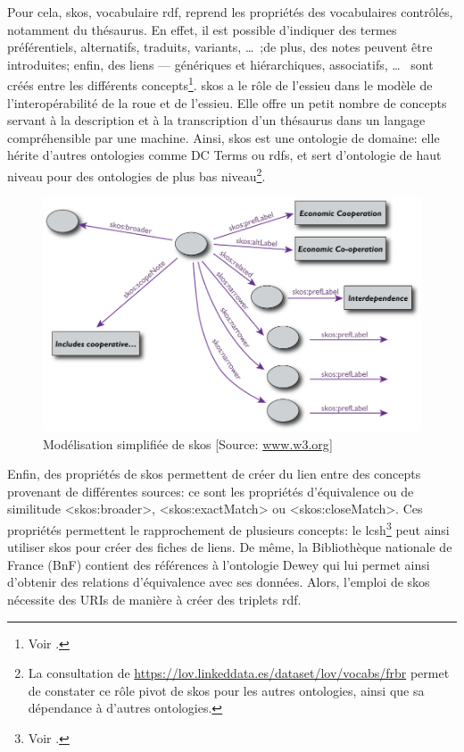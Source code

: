 Pour cela, \ac{skos}, vocabulaire \ac{rdf}, reprend les propriétés des vocabulaires contrôlés, notamment du thésaurus. En effet, il est possible d'indiquer des termes préférentiels, alternatifs, traduits, variants, \dots~;de plus, des notes peuvent être introduites; enfin, des liens --- génériques et hiérarchiques, associatifs, \dots~ sont créés entre les différents concepts\footnote{Voir .}. \ac{skos} a le rôle de l'essieu dans le modèle de l'interopérabilité de la roue et de l'essieu. Elle offre un petit nombre de concepts servant à la description et à la transcription d'un thésaurus dans un langage compréhensible par une machine. Ainsi, \ac{skos} est une ontologie de domaine: elle hérite d'autres ontologies comme DC Terms ou \ac{rdfs}, et sert d'ontologie de haut niveau pour des ontologies de plus bas niveau\footnote{La consultation de \url{https://lov.linkeddata.es/dataset/lov/vocabs/frbr} permet de constater ce rôle pivot de \ac{skos} pour les autres ontologies, ainsi que sa dépendance à d'autres ontologies.}.\\

\begin{figure}[!h]
	\centering
	\includegraphics[width=13cm]{images/SKOS_simpleThesaurus.png}
	\caption[Modélisation simplifiée de \ac{skos}]{Modélisation simplifiée de \ac{skos} [Source: \href{https://www.w3.org/Consortium/Offices/Presentations/RDFTutorial/figures/SKOS_simpleThesaurus.png}{www.w3.org}]}
	\label{skos_modelisation}
\end{figure}
\medskip

Enfin, des propriétés de \ac{skos} permettent de créer du lien entre des concepts provenant de différentes sources: ce sont les propriétés d'équivalence ou de similitude <skos:broader>, <skos:exactMatch> ou <skos:closeMatch>. Ces propriétés permettent le rapprochement de plusieurs concepts: le \ac{lcsh}\footnote{Voir .} peut ainsi utiliser \ac{skos} pour créer des fiches de liens. De même, la Bibliothèque nationale de France (BnF) contient des références à l'ontologie Dewey qui lui permet ainsi d'obtenir des relations d'équivalence avec ses données. Alors, l'emploi de \ac{skos} nécessite des URIs de manière à créer des triplets \ac{rdf}.\\

